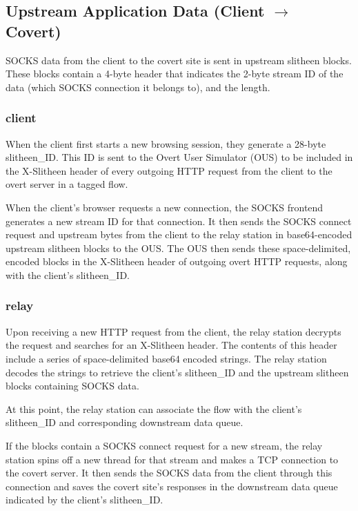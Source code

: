 \documentclass[11pt]{article}
\theoremstyle{definittion}
\begin{document}
\subsection{Upstream Application Data (Client $\rightarrow$ Covert)}

SOCKS data from the client to the covert site is sent in upstream slitheen blocks. These blocks contain a 4-byte header that indicates the 2-byte stream ID of the data (which SOCKS connection it belongs to), and the length.

\subsubsection{client}
When the client first starts a new browsing session, they generate a 28-byte slitheen\_ID. This ID is sent to the Overt User Simulator (OUS) to be included in the X-Slitheen header of every outgoing HTTP request from the client to the overt server in a tagged flow.

When the client's browser requests a new connection, the SOCKS frontend generates a new stream ID for that connection. It then sends the SOCKS connect request and upstream bytes from the client to the relay station in base64-encoded upstream slitheen blocks to the OUS. The OUS then sends these space-delimited, encoded blocks in the X-Slitheen header of outgoing overt HTTP requests, along with the client's slitheen\_ID. 

\subsubsection{relay}

Upon receiving a new HTTP request from the client, the relay station decrypts the request and searches for an X-Slitheen header. The contents of this header include a series of space-delimited base64 encoded strings. The relay station decodes the strings to retrieve the client's slitheen\_ID and the upstream slitheen blocks containing SOCKS data.

At this point, the relay station can associate the flow with the client's slitheen\_ID and corresponding downstream data queue.

If the blocks contain a SOCKS connect request for a new stream, the relay station spins off a new thread for that stream and makes a TCP connection to the covert server. It then sends the SOCKS data from the client through this connection and saves the covert site's responses in the downstream data queue indicated by the client's slitheen\_ID.
\end{document}
